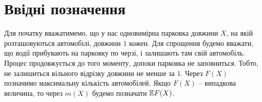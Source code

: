 \section{Ввідні позначення}

Для початку вважатимемо, що у нас одновимірна парковка довжини $X$, на якій розташовуються автомобілі, довжини $1$ кожен.
Для спрощення будемо вважати, що водії прибувають на парковку по черзі, і залишають там свій автомобіль. Процес продовжується до того моменту, допоки парковка не заповниться. Тобто, не залишиться вільного відрізку довжини не менше за $1$.
Через $F(X)$ позначимо максимальну кількість автомобілей. Якщо $F(X)$ – випадкова величина, то через $m(X)$ будемо позначати $\mathbb{E} F(X)$.